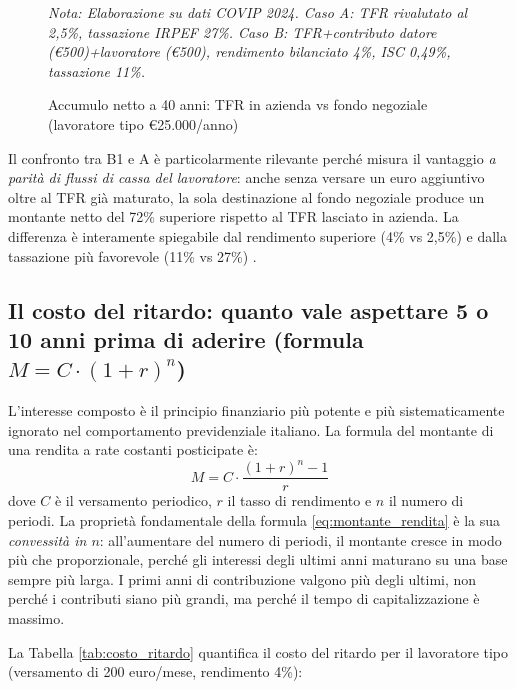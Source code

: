 \begin{figure}[h!]
\centering
\caption{Accumulo netto a 40 anni: TFR in azienda vs fondo negoziale
         (lavoratore tipo €25.000/anno)}
\label{fig:tfr_fondo}
\small\emph{Nota: Elaborazione su dati COVIP 2024. Caso A: TFR rivalutato al 2,5\%,
tassazione IRPEF 27\%. Caso B: TFR+contributo datore (€500)+lavoratore (€500),
rendimento bilanciato 4\%, ISC 0,49\%, tassazione 11\%.}
\end{figure}

\noindent
Il confronto tra B1 e A è particolarmente rilevante perché misura
il vantaggio \emph{a parità di flussi di cassa del lavoratore}:
anche senza versare un euro aggiuntivo oltre al TFR già maturato,
la sola destinazione al fondo negoziale produce un montante netto
del 72\% superiore rispetto al TFR lasciato in azienda.
La differenza è interamente spiegabile dal rendimento superiore (4\%
vs 2,5\%) e dalla tassazione più favorevole (11\% vs 27\%) \cite{COVIP2025}.

\subsection{Il costo del ritardo: quanto vale aspettare 5 o 10 anni
            prima di aderire (formula $M = C \cdot (1+r)^n$)}
\label{sub:costo_ritardo}

\noindent
L'interesse composto è il principio finanziario più potente e più
sistematicamente ignorato nel comportamento previdenziale italiano.
La formula del montante di una rendita a rate costanti posticipate è:
\begin{equation}
    M = C \cdot \frac{(1+r)^n - 1}{r}
    \label{eq:montante_rendita}
\end{equation}
dove $C$ è il versamento periodico, $r$ il tasso di rendimento e
$n$ il numero di periodi.
La proprietà fondamentale della formula \eqref{eq:montante_rendita}
è la sua \emph{convessità in $n$}: all'aumentare del numero di periodi,
il montante cresce in modo più che proporzionale, perché gli interessi
degli ultimi anni maturano su una base sempre più larga.
I primi anni di contribuzione valgono più degli ultimi, non perché
i contributi siano più grandi, ma perché il tempo di capitalizzazione
è massimo.

\medskip
\noindent
La Tabella \ref{tab:costo_ritardo} quantifica il costo del ritardo
per il lavoratore tipo (versamento di 200 euro/mese, rendimento 4\%):

